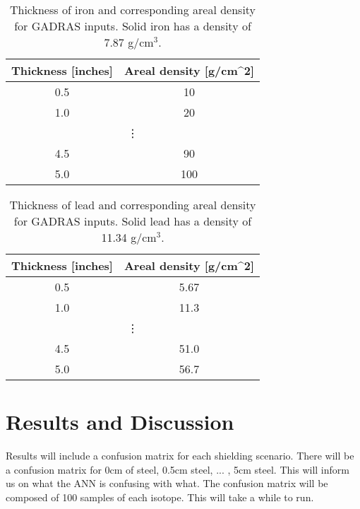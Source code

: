 \documentclass[thesis,tocnosub,noragright,centerchapter,12pt,fullpage]{uiucecethesis09}
\begin{document}


\begin{table}[]
\centering
\caption{Thickness of iron and corresponding areal density for GADRAS inputs. Solid iron has a density of 7.87 g/cm$^{3}$.}
\label{Irontable}
\begin{tabular}{|c|c|}
\hline
Thickness {[}inches{]} & Areal density {[}g/cm\textasciicircum 2{]} \\ \hline
0.5 & 10 \\ \hline
1.0 & 20 \\ \hline
\multicolumn{2}{c}{\vdots} \\ \hline
4.5 & 90 \\ \hline
5.0 & 100 \\ \hline
\end{tabular}
\end{table}


\begin{table}[]
\centering
\caption{Thickness of lead and corresponding areal density for GADRAS inputs. Solid lead has a density of 11.34 g/cm$^{3}$.}
\label{my-label}
\begin{tabular}{|c|c|}
\hline
Thickness {[}inches{]} & Areal density {[}g/cm\textasciicircum 2{]} \\ \hline
0.5 & 5.67 \\ \hline
1.0 & 11.3 \\ \hline
\multicolumn{2}{c}{\vdots} \\ \hline
4.5 & 51.0 \\ \hline
5.0 & 56.7 \\ \hline
\end{tabular}
\end{table}

\section{Results and Discussion}

Results will include a confusion matrix for each shielding scenario. There will be a confusion matrix for 0cm of steel, 0.5cm steel, ... , 5cm steel. This will inform us on what the ANN is confusing with what. The confusion matrix will be composed of 100 samples of each isotope. This will take a while to run.
\end{document}
